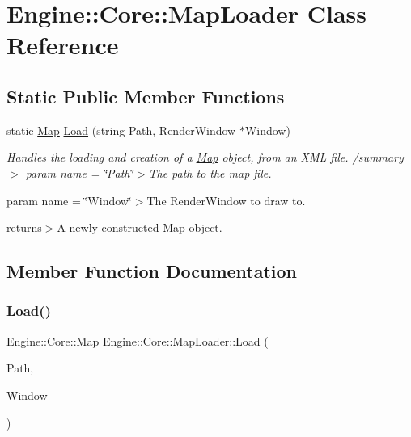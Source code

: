 \hypertarget{class_engine_1_1_core_1_1_map_loader}{}\section{Engine\+:\+:Core\+:\+:Map\+Loader Class Reference}
\label{class_engine_1_1_core_1_1_map_loader}
\subsection*{Static Public Member Functions}
\begin{DoxyCompactItemize}
\item 
static \hyperlink{class_engine_1_1_core_1_1_map}{Map} \hyperlink{class_engine_1_1_core_1_1_map_loader_a32e2582da2a0173435e6508c3b23434b}{Load} (string Path, Render\+Window $\ast$Window)
\begin{DoxyCompactList}\small\item\em Handles the loading and creation of a \hyperlink{class_engine_1_1_core_1_1_map}{Map} object, from an X\+ML file. /summary$>$ param name = \char`\"{}\+Path\char`\"{}$>$The path to the map file.

param name = \char`\"{}\+Window\char`\"{}$>$The Render\+Window to draw to.

returns$>$A newly constructed \hyperlink{class_engine_1_1_core_1_1_map}{Map} object.\end{DoxyCompactList}\end{DoxyCompactItemize}


\subsection{Member Function Documentation}
\mbox{\label{class_engine_1_1_core_1_1_map_loader_a32e2582da2a0173435e6508c3b23434b}} 
\subsubsection{\texorpdfstring{Load()}{Load()}}
{\footnotesize\ttfamily \hyperlink{class_engine_1_1_core_1_1_map}{Engine\+::\+Core\+::\+Map} Engine\+::\+Core\+::\+Map\+Loader\+::\+Load (\begin{DoxyParamCaption}\item[{string}]{Path,  }\item[{Render\+Window $\ast$}]{Window }\end{DoxyParamCaption})\hspace{0.3cm}{\ttfamily [static]}}



